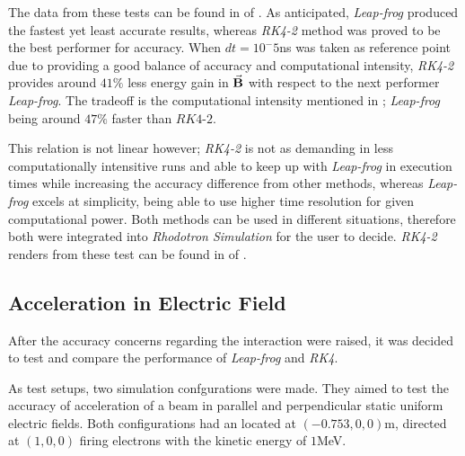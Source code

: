 \documentclass[a4paper,oneside,12pt]{report}
\numberwithin{equation}{chapter}
\begin{document}
The data from these tests can be found in  of . 
As anticipated, \textit{Leap-frog} produced the fastest yet least accurate results, whereas \textit{RK4-2} method was proved to be the best performer for accuracy.
When $dt=10^-5$ns was taken as reference point due to providing a good balance of accuracy and computational intensity, 
\textit{RK4-2} provides around $41\%$ less energy gain in $\vec{\textbf{B}}$ with respect to the next performer \textit{Leap-frog}.
The tradeoff is the computational intensity mentioned in ; \textit{Leap-frog} being around $47\%$ faster than $\textit{RK4-2}$.

This relation is not linear however; \textit{RK4-2} is not as demanding in less computationally intensitive runs and able to keep up with \textit{Leap-frog} in execution times while increasing the accuracy difference from other methods,
whereas \textit{Leap-frog} excels at simplicity, being able to use higher time resolution for given computational power. 
Both methods can be used in different situations, therefore both were integrated into \textit{Rhodotron Simulation} for the user to decide.
\textit{RK4-2} renders from these test can be found in  of .



\subsection{Acceleration in Electric Field}
After the accuracy concerns regarding the \eB interaction were raised, it was decided to test \eE and compare the performance of \textit{Leap-frog} and \textit{RK4}.

As test setups, two simulation confgurations were made. They aimed to test the accuracy of acceleration of a beam in parallel and perpendicular static uniform electric fields.
Both configurations had an \egun located at $(-0.753, 0, 0)$m, directed at $(1, 0, 0)$ firing electrons with the kinetic energy of $1$MeV. 
\end{document}
